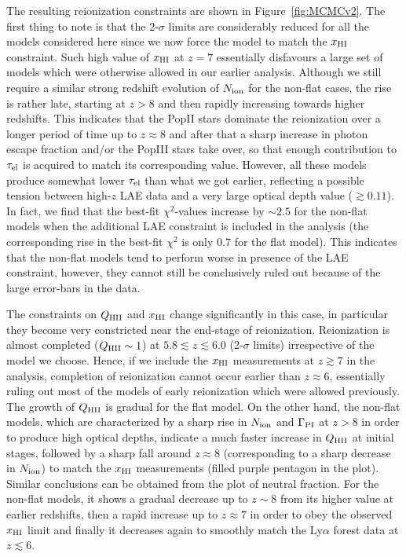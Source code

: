 \documentclass[useAMS,usenatbib]{mnras}
\begin{document}
The resulting reionization constraints are shown in Figure~\ref{fig:MCMCv2}. The first thing to note is
that the 2-$\sigma$ limits are considerably reduced for all the models considered here since we now
force the model to match the $x_{\rm HI}$ constraint. Such high value of $x_{\rm HI}$ at $z=7$
essentially disfavours a large set of models which were otherwise allowed in our earlier analysis.
Although we still require a similar strong redshift evolution of $N_{\rm ion}$ for the non-flat cases,
the rise is rather late, starting at $z>8$ and then rapidly increasing towards higher redshifts.
This indicates that the PopII stars dominate the reionization over a longer period of time
up to $z\approx8$ and after that a sharp increase in photon escape fraction and/or the
PopIII stars take over, so that enough contribution to $\tau_{\rm el}$ is acquired
to match its corresponding value. However, all these models produce somewhat lower $\tau_{\rm el}$
than what we got earlier, reflecting a possible tension between high-$z$ LAE data and a very
large optical depth value ($\gtrsim 0.11$). In fact, we find that the best-fit $\chi^2$-values
increase by $\sim 2.5$ for the non-flat models when the additional LAE constraint is included
in the analysis (the corresponding rise in the best-fit $\chi^2$ is only $0.7$ for the flat model).
This indicates that the non-flat models tend to perform worse in presence of the LAE constraint,
however, they cannot still be conclusively ruled out because of the large error-bars in the data.

The constraints on $Q_{\rm HII}$ and $x_{\rm HI}$
change significantly in this case, in particular they become very constricted near the end-stage
of reionization. Reionization is almost completed ($Q_{\rm HII}\sim1$) at $5.8\lesssim z\lesssim6.0$
(2-$\sigma$ limits) irrespective of the model we choose. Hence, if we include the $x_{\rm HI}$
measurements at $z\gtrsim7$ in the analysis, completion of reionization cannot occur earlier than
$z\approx6$, essentially ruling out most of the models of early reionization which were allowed
previously. The growth of $Q_{\rm HII}$ is gradual for the flat model. On the other hand, the non-flat
models, which are characterized by a sharp rise in $N_{\rm ion}$ and $\Gamma_{\rm PI}$ at $z>8$
in order to produce high optical depths, indicate a much faster increase in $Q_{\rm HII}$ at
initial stages, followed by a sharp fall around $z\approx8$ (corresponding to a sharp decrease
in $N_{\rm ion}$) to match the $x_{\rm HI}$ measurements (filled purple pentagon in the plot). 
Similar conclusions can be obtained from the plot of neutral fraction. For the non-flat models,
it shows a gradual decrease up to $z\sim8$ from its higher value at earlier redshifts, then a rapid increase 
up to $z\approx7$ in order to obey the observed $x_{\rm HI}$ limit and finally it decreases
again to smoothly match the Ly$\alpha$ forest data at $z\lesssim6$.
\end{document}
